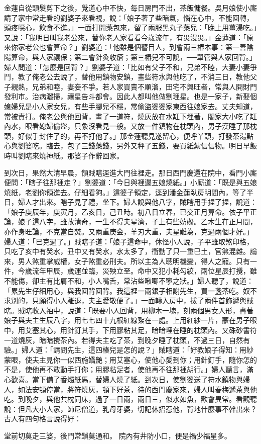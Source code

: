 金蓮自從頭髮剪下之後，覺道心中不快，每日房門不出，茶飯慵餐。吳月娘使小廝請了家中常走看的劉婆子來看視，說：「娘子著了些暗氣，惱在心中，不能回轉，頭疼噁心，飲食不進。」一面打開藥包來，留了兩服黑丸子藥兒：「晚上用薑湯吃。」又說：「我明日叫我老公來，替你老人家看看今歲流年，有災沒災。」金蓮道：「原來你家老公也會算命？」劉婆道：「他雖是個瞽目人，到會兩三椿本事：第一善陰陽算命，與人家禳保；第二會針灸收瘡；第三椿兒不可說，──單管與人家回背。」婦人問道：「怎麼是回背？」劉婆子道：「比如有父子不和，兄弟不睦，大妻小妻爭鬥，教了俺老公去說了，替他用鎮物安鎮，畫些符水與他吃了，不消三日，教他父子親熱，兄弟和睦，妻妾不爭。若人家買賣不順溜，田宅不興旺者，常與人開財門發利市。治病灑掃，禳星告斗都會。因此人都叫他做劉理星。也是一家子，新娶個媳婦兒是小人家女兒，有些手腳兒不穩，常偷盜婆婆家東西往娘家去。丈夫知道，常被責打。俺老公與他回背，畫了一道符，燒灰放在水缸下埋著，閤家大小吃了缸內水，眼看媳婦偷盜，只象沒看見一般。又放一件鎮物在枕頭內，男子漢睡了那枕頭，好似手封住了的，再不打他了。」那金蓮聽見遂留心，便呼丫頭，打發茶湯點心與劉婆吃。臨去，包了三錢藥錢，另外又秤了五錢，要買紙紮信信物。明日早飯時叫劉瞎來燒神紙。那婆子作辭回家。

到次日，果然大清早晨，領賊瞎逕進大門往裡走。那日西門慶還在院中，看門小廝便問：「瞎子往那裡走？」劉婆道：「今日與裡邊五娘燒紙。」小廝道：「既是與五娘燒紙，老劉你領進去。仔細看狗。」這婆子領定，逕到潘金蓮臥房明間內，等了半日，婦人才出來。瞎子見了禮，坐下。婦人說與他八字，賊瞎用手捏了捏，說道：「娘子庚辰年，庚寅月，乙亥日，己丑時。初八日立春，已交正月算命。依子平正論，娘子這八字，雖故清奇，一生不得夫星濟，子上有些妨礙。乙木生在正月間，亦作身旺論，不克當自焚。又兩重庚金，羊刃大重，夫星難為，克過兩個才好。」婦人道：「已克過了。」賊瞎子道：「娘子這命中，休怪小人說，子平雖取煞印格，只吃了亥中有癸水，丑中又有癸水，水太多了，衝動了只一重巳土，官煞混雜。論來，男人煞重掌威權，女子煞重必刑夫。所以主為人聰明機變，得人之寵。只有一件，今歲流年甲辰，歲運並臨，災殃立至。命中又犯小耗勾絞，兩位星辰打攪，雖不能傷，卻主有比肩不和，小人嘴舌，常沾些啾唧不寧之狀。」婦人聽了，說道：「累先生仔細用心，與我回背回背。我這裡一兩銀子相謝先生，買一盞茶吃。奴不求別的，只願得小人離退，夫主愛敬便了。」一面轉入房中，拔了兩件首飾遞與賊瞎。賊瞎收入袖中，說道：「既要小人回背，用柳木一塊，刻兩個男女人形，書著娘子與夫主生辰八字，用七七四十九根紅線紮在一處。上用紅紗一片，蒙在男子眼中，用艾塞其心，用針釘其手，下用膠粘其足，暗暗埋在睡的枕頭內。又硃砂書符一道燒灰，暗暗攪茶內。若得夫主吃了茶，到晚夕睡了枕頭，不過三日，自然有驗。」婦人道：「請問先生，這四椿兒是怎的說？」賊瞎道：「好教娘子得知：用紗蒙眼，使夫主見你一似西施嬌艷；用艾塞心，使他心愛到你；用針釘手，隨你怎的不是，使他再不敢動手打你；用膠粘足者，使他再不往那裡胡行。」婦人聽言，滿心歡喜。當下備了香燭紙馬，替婦人燒了紙。到次日，使劉婆送了符水鎮物與婦人，如法安頓停當，將符燒灰，頓下好茶，待的西門慶家來，婦人叫春梅遞茶與他吃。到晚夕，與他共枕同床，過了一日兩，兩日三，似水如魚，歡會異常。看觀聽說：但凡大小人家，師尼僧道，乳母牙婆，切記休招惹他，背地什麼事不幹出來？古人有四句格言說得好：

堂前切莫走三婆，後門常鎖莫通和。
院內有井防小口，便是禍少福星多。

